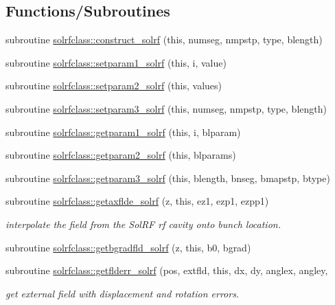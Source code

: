 \subsection*{Functions/\+Subroutines}
\begin{DoxyCompactItemize}
\item 
subroutine \mbox{\hyperlink{namespacesolrfclass_a3d7deb451633bf4e6fc42e0b43f21e2e}{solrfclass\+::construct\+\_\+solrf}} (this, numseg, nmpstp, type, blength)
\item 
subroutine \mbox{\hyperlink{namespacesolrfclass_ad06b3becdb99ba947f714809bea2af35}{solrfclass\+::setparam1\+\_\+solrf}} (this, i, value)
\item 
subroutine \mbox{\hyperlink{namespacesolrfclass_a4f5cee7483285ca745064b5331f3c30f}{solrfclass\+::setparam2\+\_\+solrf}} (this, values)
\item 
subroutine \mbox{\hyperlink{namespacesolrfclass_ae51249f1d976b6ff71436430614a854e}{solrfclass\+::setparam3\+\_\+solrf}} (this, numseg, nmpstp, type, blength)
\item 
subroutine \mbox{\hyperlink{namespacesolrfclass_af623613497d4af2070e81c255374535e}{solrfclass\+::getparam1\+\_\+solrf}} (this, i, blparam)
\item 
subroutine \mbox{\hyperlink{namespacesolrfclass_ac8cc63a77159c54d547e156bf816e7d1}{solrfclass\+::getparam2\+\_\+solrf}} (this, blparams)
\item 
subroutine \mbox{\hyperlink{namespacesolrfclass_abb727d5c5f8ebd6af19e036fe9204923}{solrfclass\+::getparam3\+\_\+solrf}} (this, blength, bnseg, bmapstp, btype)
\item 
subroutine \mbox{\hyperlink{namespacesolrfclass_a1033b422b682ef72ecc3b482c38b5065}{solrfclass\+::getaxflde\+\_\+solrf}} (z, this, ez1, ezp1, ezpp1)
\begin{DoxyCompactList}\small\item\em interpolate the field from the Sol\+RF rf cavity onto bunch location. \end{DoxyCompactList}\item 
subroutine \mbox{\hyperlink{namespacesolrfclass_adf7673f885573c8468f07faebc432d7d}{solrfclass\+::getbgradfld\+\_\+solrf}} (z, this, b0, bgrad)
\item 
subroutine \mbox{\hyperlink{namespacesolrfclass_a8a44826fce541cba8b4f7f5573ec7c98}{solrfclass\+::getflderr\+\_\+solrf}} (pos, extfld, this, dx, dy, anglex, angley,
\begin{DoxyCompactList}\small\item\em get external field with displacement and rotation errors. \end{DoxyCompactList}\item 

\end{DoxyCompactItemize}
